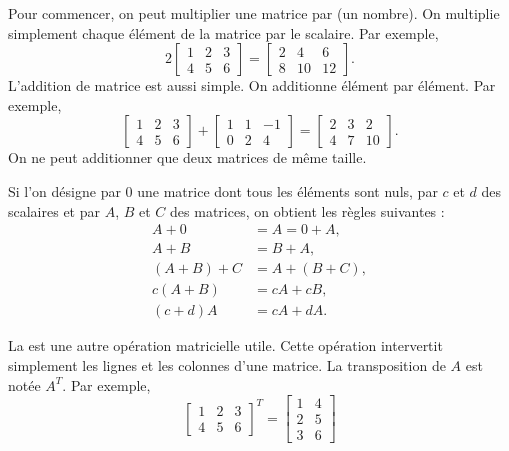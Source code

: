 Pour commencer, on peut multiplier une matrice par  \emph{} (un nombre).
On multiplie simplement chaque élément de la matrice par le scalaire. Par exemple,
\begin{equation*}
2
\begin{bmatrix}
1 & 2 & 3 \\
4 & 5 & 6
\end{bmatrix} =
\begin{bmatrix}
2 & 4 & 6 \\
8 & 10 & 12
\end{bmatrix} .
\end{equation*}
L’addition de matrice est aussi simple. On additionne élément par élément. Par exemple,
\begin{equation*}
\begin{bmatrix}
1 & 2 & 3 \\
4 & 5 & 6
\end{bmatrix} +
\begin{bmatrix}
1 & 1 & -1 \\
0 & 2 & 4
\end{bmatrix}
=
\begin{bmatrix}
2 & 3 & 2 \\
4 & 7 & 10
\end{bmatrix} .
\end{equation*}
On ne peut additionner que deux matrices de même taille.

Si l'on désigne par 0 une matrice dont tous les éléments sont nuls, par
$c$ et $d$ des scalaires et par $A$, $B$ et $C$ des matrices, on obtient les règles suivantes :
\begin{align*}
A + 0 & = A = 0 + A , \\
A + B & = B + A , \\
(A + B) + C & = A + (B + C) , \\
c(A+B) & = cA+cB, \\
(c+d)A & = cA + dA.
\end{align*}

La \emph{} est une autre opération matricielle utile. Cette opération intervertit simplement les lignes et les colonnes d’une matrice. La transposition de $A$ est notée $A^T$. Par exemple,
\begin{equation*}
\begin{bmatrix}
1 & 2 & 3 \\
4 & 5 & 6
\end{bmatrix}^T =
\begin{bmatrix}
1 & 4 \\
2 & 5 \\
3 & 6 
\end{bmatrix}
\end{equation*}

